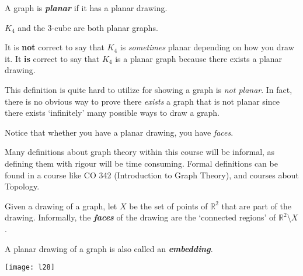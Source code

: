 \begin{defbox}
    \begin{definition}
        A graph is \textbf{\emph{planar}} if it has a planar drawing.
    \end{definition}
\end{defbox}

\begin{exbox}
    \begin{example}[Planar]
        $ K_4 $ and the $ 3 $-cube are both planar graphs.
    \end{example}
\end{exbox}
\begin{remark}
    It is \textbf{not} correct to say that $ K_4 $ is \emph{sometimes}
    planar depending on how you draw it. It \textbf{is} correct to say
    that $ K_4 $ is a planar graph because there exists a planar drawing.
\end{remark}

This definition is quite hard to utilize for showing a graph is
\emph{not planar}. In fact, there is no obvious way
to prove there \emph{exists} a graph that is not planar since there exists
`infinitely' many possible ways to draw a graph.

Notice that whether you have a planar drawing, you have \emph{faces}.

\begin{remark}
    Many definitions about graph theory within this course will be informal,
    as defining them with rigour will be time consuming. Formal definitions
    can be found in a course like CO 342 (Introduction to Graph Theory),
    and courses about Topology.
\end{remark}

\begin{defbox}
    \begin{definition}
        Given a drawing of a graph,
        let $ X $ be the set of points of $ \mathbb{R}^2 $ that
        are part of the drawing. Informally, the \textbf{\emph{faces}}
        of the drawing are the `connected regions'
        of $ \mathbb{R}^2\setminus X $.
    \end{definition}
\end{defbox}

\begin{remark}
    A planar drawing of a graph is also called an \textbf{\emph{embedding}}.
\end{remark}


\begin{center}
    \texttt{[image: l28]}
\end{center}

